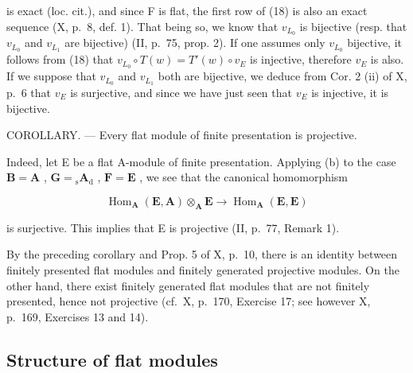 is exact (loc. cit.), and since F is flat, the first row of (18) is also an exact sequence (X, p.~8, def. 1). That being so, we know that \(v_{L_0}\) is bijective (resp. that \(v_{L_0}\) and \(v_{L_1}\) are bijective) (II, p.~75, prop. 2). If one assumes only \(v_{L_0}\) bijective, it follows from (18) that \(v_{L_0} \circ T(w) = T'(w) \circ v_E\) is injective, therefore \(v_E\) is also. If we suppose that \(v_{L_0}\) and \(v_{L_1}\) both are bijective, we deduce from Cor. 2 (ii) of X, p.~6 that \(v_E\) is surjective, and since we have just seen that \(v_E\) is injective, it is bijective.

COROLLARY. --- Every flat module of finite presentation is projective.

Indeed, let E be a flat A-module of finite presentation. Applying (b) to the case \(\mathbf{B} = \mathbf{A}\) , \(\mathbf{G} = {}_{\mathrm{s}}\mathbf{A}_{\mathrm{d}}\) , \(\mathbf{F} = \mathbf{E}\) , we see that the canonical homomorphism

\[
\operatorname{Hom} _ {\mathbf {A}} (\mathbf {E}, \mathbf {A}) \otimes_ {\mathbf {A}} \mathbf {E} \rightarrow \operatorname{Hom} _ {\mathbf {A}} (\mathbf {E}, \mathbf {E})
\]

is surjective. This implies that E is projective (II, p.~77, Remark 1).

By the preceding corollary and Prop. 5 of X, p.~10, there is an identity between finitely presented flat modules and finitely generated projective modules. On the other hand, there exist finitely generated flat modules that are not finitely presented, hence not projective (cf.~X, p.~170, Exercise 17; see however X, p.~169, Exercises 13 and 14).

\subsection{Structure of flat modules}

